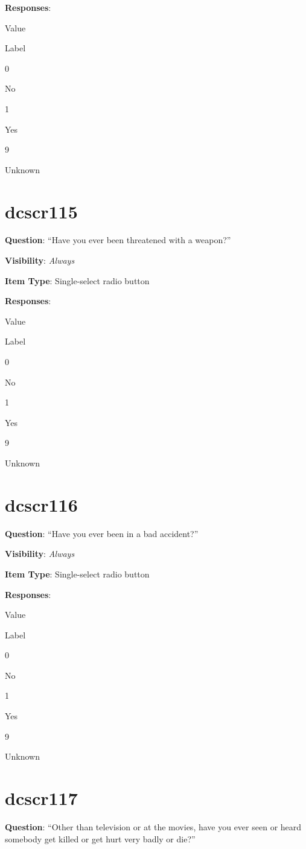 \documentclass[]{book}
\begin{document}
\textbf{Responses}:

Value

Label

0

No

1

Yes

9

Unknown

\hypertarget{dcscr115}{%
\section{dcscr115}\label{dcscr115}}

\textbf{Question}: ``Have you ever been threatened with a weapon?''

\textbf{Visibility}: \emph{Always}

\textbf{Item Type}: Single-select radio button

\textbf{Responses}:

Value

Label

0

No

1

Yes

9

Unknown

\hypertarget{dcscr116}{%
\section{dcscr116}\label{dcscr116}}

\textbf{Question}: ``Have you ever been in a bad accident?''

\textbf{Visibility}: \emph{Always}

\textbf{Item Type}: Single-select radio button

\textbf{Responses}:

Value

Label

0

No

1

Yes

9

Unknown

\hypertarget{dcscr117}{%
\section{dcscr117}\label{dcscr117}}

\textbf{Question}: ``Other than television or at the movies, have you ever seen or heard somebody get killed or get hurt very badly or die?''
\end{document}
